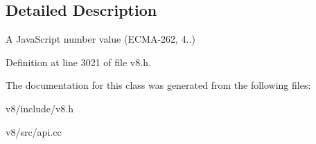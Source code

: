 \subsection{Detailed Description}
A Java\+Script number value (E\+C\+M\+A-\/262, 4..) 

Definition at line 3021 of file v8.\+h.



The documentation for this class was generated from the following files\+:\begin{DoxyCompactItemize}
\item 
v8/include/v8.\+h\item 
v8/src/api.\+cc\end{DoxyCompactItemize}
